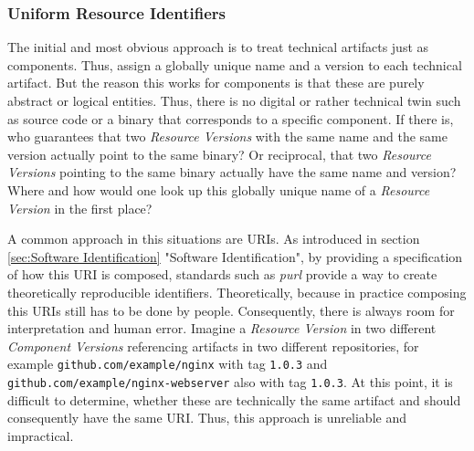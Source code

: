 \subsubsection{Uniform Resource Identifiers} 
The initial and most obvious approach is to treat technical artifacts just as components. Thus, assign a globally unique name and a version to each technical artifact. But the reason this works for components is that these are purely abstract or logical entities. Thus, there is no digital or rather technical twin such as source code or a binary that corresponds to a specific component. If there is, who guarantees that two \emph{Resource Versions} with the same name and the same version actually point to the same binary? Or reciprocal, that two \emph{Resource Versions} pointing to the same binary actually have the same name and version? Where and how would one look up this globally unique name of a \emph{Resource Version} in the first place?\par
A common approach in this situations are URIs. %
As introduced in section \ref{sec:Software Identification} "Software Identification", by providing a specification of how this URI is composed, standards such as \emph{purl} provide a way to create theoretically reproducible identifiers. Theoretically, because in practice composing this URIs still has to be done by people. Consequently, there is always room for interpretation and human error. Imagine a \emph{Resource Version} in two different \emph{Component Versions} referencing artifacts in two different repositories, for example \lstinline|github.com/example/nginx| with tag \lstinline|1.0.3| and \lstinline|github.com/example/nginx-webserver| also with tag \lstinline|1.0.3|. At this point, it is difficult to determine, whether these are technically the same artifact and should consequently have the same URI. Thus, this approach is unreliable and impractical.

